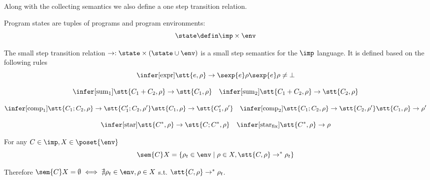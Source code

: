 Along with the collecting semantics we also define a one step
transition relation.

\begin{definition}
  Program states are tuples of programs and program
  environments: \[\state \defin \imp \times \env\]
\end{definition}

\begin{definition}\label{def:sosem}
  The small step transition relation \(\to : \state \times (\state
  \cup \env)\) is a small step semantics for the
  \(\imp\) language. It is defined based on the following rules
  \[\infer[\text{expr}]
          {\stt{e, \rho} \to \sexp{e}\rho}
          {\sexp{e}\rho \neq \bot}\]
          
          \[\infer[\text{sum}_1]
                  {\stt{C_1 + C_2, \rho} \to \stt{C_1, \rho}}
                  {} \quad
                  \infer[\text{sum}_2]
                        {\stt{C_1 + C_2, \rho} \to \stt{C_2, \rho}}
                        {}\]
                        
                        \[\infer[\text{comp}_1]
                                {\stt{C_1; C_2, \rho} \to \stt{C_1'; C_2, \rho'}}
                                {\stt{C_1, \rho} \to \stt{C_1', \rho'}} \quad
                                \infer[\text{comp}_2]
                                      {\stt{C_1; C_2, \rho} \to \stt{C_2, \rho'}}
                                      {\stt{C_1, \rho} \to \rho'}\]

                                      \[\infer[\text{star}]
                                              {\stt{C^*, \rho} \to \stt{C;C^*, \rho}}
                                              {} \quad
                                              \infer[\text{star}_{\text{fix}}]
                                                    {\stt{C^*, \rho} \to \rho}
                                                    {}\]
\end{definition}

\begin{lemma}\label{le:link}
  For any \(C\in\imp, X \in \poset{\env}\) \[\sem{C}X = \{\rho_t \in
  \env \mid \rho \in X, \stt{C, \rho} \to^* \rho_t\}\]
\end{lemma}

Therefore \(\sem{C}X = \emptyset \iff \nexists \rho_t \in \env, \rho
\in X\) s.t. \(\stt{C, \rho} \to^* \rho_t\).

